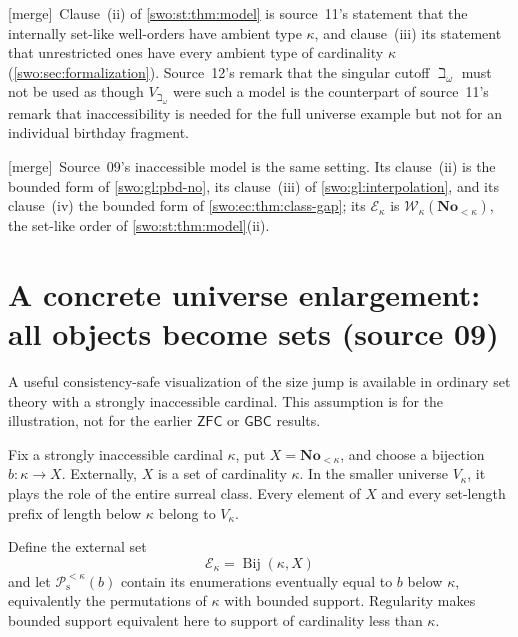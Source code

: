 \documentclass[11pt]{article}
\theoremstyle{definition}
\theoremstyle{remark}
\newcommand{\No}{\mathbf{No}}
\newcommand{\WO}{\mathcal W}
\newcommand{\Psupp}{\mathcal P_{\mathrm{s}}}
\newcommand{\Bij}{\operatorname{Bij}}
\newcommand{\GBC}{\mathsf{GBC}}
\newcommand{\ZFC}{\mathsf{ZFC}}
\newcommand{\merge}{\textsf{[merge]}}
\begin{document}
\merge\ Clause~(ii) of \cref{swo:st:thm:model} is source~11's statement that
the internally set-like well-orders have ambient type $\kappa$, and
clause~(iii) its statement that unrestricted ones have every ambient type of
cardinality $\kappa$ (\cref{swo:sec:formalization}). Source~12's remark that
the singular cutoff $\beth_\omega$ must not be used as though
$V_{\beth_\omega}$ were such a model is the counterpart of source~11's remark
that inaccessibility is needed for the full universe example but not for an
individual birthday fragment.


\merge\ Source~09's inaccessible model is the same setting. Its clause~(ii) is
the bounded form of \cref{swo:gl:pbd-no}, its clause~(iii) of
\cref{swo:gl:interpolation}, and its clause~(iv) the bounded form of
\cref{swo:ec:thm:class-gap}; its $\mathcal E_\kappa$ is
$\WO_\kappa(\No_{<\kappa})$, the set-like order of
\cref{swo:st:thm:model}(ii).

\section{A concrete universe enlargement: all objects become sets (source 09)}
\label{swo:ec:sec:universe}
A useful consistency-safe visualization of the size jump is available
in ordinary set theory with a strongly inaccessible cardinal. This
assumption is for the illustration, not for the earlier $\ZFC$ or
$\GBC$ results.

Fix a strongly inaccessible cardinal $\kappa$, put $X=\No_{<\kappa}$,
and choose a bijection $b:\kappa\to X$. Externally, $X$ is a set of
cardinality $\kappa$. In the smaller universe $V_\kappa$, it plays the
role of the entire surreal class. Every element of $X$ and every
set-length prefix of length below $\kappa$ belong to $V_\kappa$.

Define the external set
\[
         \mathcal E_\kappa=\Bij(\kappa,X)
\]
and let $\Psupp^{<\kappa}(b)$ contain its enumerations eventually equal
to $b$ below $\kappa$, equivalently the permutations of $\kappa$ with
bounded support. Regularity makes bounded support equivalent here to
support of cardinality less than $\kappa$.
\end{document}
